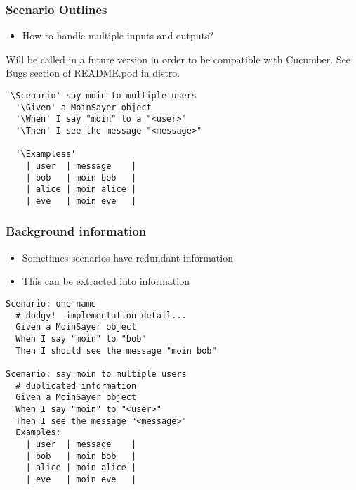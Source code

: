 \documentclass[10pt]{vcs_beamer}
\newcommand{\Scenario}{\color{BlueViolet}{Scenario:}}
\newcommand{\ScenarioOutline}{\color{BlueViolet}{Scenario Outline:}}
\newcommand{\Exampless}{\color{BlueViolet}{Examples:}}
\newcommand{\Given}{\color{DarkOrange}{Given}}
\newcommand{\When}{\color{RoyalBlue}{When}}
\newcommand{\Then}{\color{ForestGreen}{Then}}
\begin{document}
\begin{frame}[fragile]
\frametitle{Scenario Outlines}

\begin{itemize}
    \item How to handle multiple inputs and outputs?
\end{itemize}

Will be called \ttt{\ScenarioOutline} in a future version in order to be
compatible with Cucumber.  See Bugs section of README.pod in distro.

\begin{lstlisting}[escapeinside='']
'\Scenario' say moin to multiple users
  '\Given' a MoinSayer object
  '\When' I say "moin" to a "<user>"
  '\Then' I see the message "<message>"

  '\Exampless'
    | user  | message    |
    | bob   | moin bob   |
    | alice | moin alice |
    | eve   | moin eve   |
\end{lstlisting}

\end{frame}

\begin{frame}[fragile]
\frametitle{Background information}

\begin{itemize}
    \item Sometimes scenarios have redundant information
    \item This can be extracted into  information
\end{itemize}

\begin{lstlisting}
Scenario: one name
  # dodgy!  implementation detail...
  Given a MoinSayer object
  When I say "moin" to "bob"
  Then I should see the message "moin bob"

Scenario: say moin to multiple users
  # duplicated information
  Given a MoinSayer object
  When I say "moin" to "<user>"
  Then I see the message "<message>"
  Examples:
    | user  | message    |
    | bob   | moin bob   |
    | alice | moin alice |
    | eve   | moin eve   |
\end{lstlisting}

\end{frame}
\end{document}
